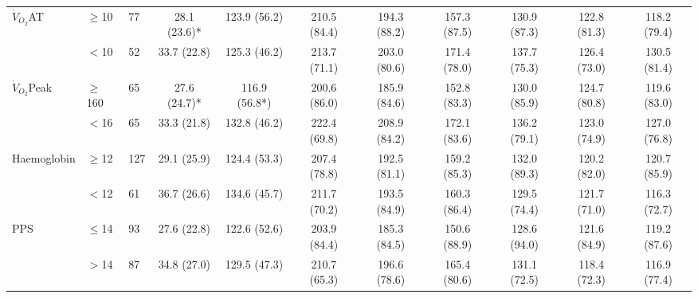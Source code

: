 \begin{sidewaystable}[p]
\begin{tabular}{|l ll | c c c c c c c c|}
		$\dot{V}_{O_2}$AT   & $\geq$10  & 77    & 28.1 (23.6)* & 123.9 (56.2)  & 210.5 (84.4)  & 194.3 (88.2)  & 157.3 (87.5)  & 130.9 (87.3)  & 122.8 (81.3)  & 118.2 (79.4)  \\
		                    & $<$10     & 52    & 33.7 (22.8)  & 125.3 (46.2)  & 213.7 (71.1)  & 203.0 (80.6)  & 171.4 (78.0)  & 137.7 (75.3)  & 126.4 (73.0)  & 130.5 (81.4)  \\
		$\dot{V}_{O_2}$Peak & $\geq$160 & 65    & 27.6 (24.7)* & 116.9 (56.8*) & 200.6 (86.0)  & 185.9 (84.6)  & 152.8 (83.3)  & 130.0 (85.9)  & 124.7 (80.8)  & 119.6 (83.0)  \\
		                    & $<$16     & 65    & 33.3 (21.8)  & 132.8 (46.2)  & 222.4 (69.8)  & 208.9 (84.2)  & 172.1 (83.6)  & 136.2 (79.1)  & 123.0 (74.9)  & 127.0 (76.8)  \\
		Haemoglobin         & $\geq$12  & 127   & 29.1 (25.9)  & 124.4 (53.3)  & 207.4 (78.8)  & 192.5 (81.1)  & 159.2 (85.3)  & 132.0 (89.3)  & 120.2 (82.0)  & 120.7 (85.9)  \\
		                    & $<$12     & 61    & 36.7 (26.6)  & 134.6 (45.7)  & 211.7 (70.2)  & 193.5 (84.9)  & 160.3 (86.4)  & 129.5 (74.4)  & 121.7 (71.0)  & 116.3 (72.7)  \\
		PPS                 & $\leq$14  & 93    & 27.6 (22.8)  & 122.6 (52.6)  & 203.9 (84.4)  & 185.3 (84.5)  & 150.6 (88.9)  & 128.6 (94.0)  & 121.6 (84.9)  & 119.2 (87.6)  \\
		                    & $>$14     & 87    & 34.8 (27.0)  & 129.5 (47.3)  & 210.7 (65.3)  & 196.6 (78.6)  & 165.4 (80.6)  & 131.1 (72.5)  & 118.4 (72.3)  & 116.9 (77.4)  \\ \hline
	\end{tabular}	
\end{sidewaystable}






